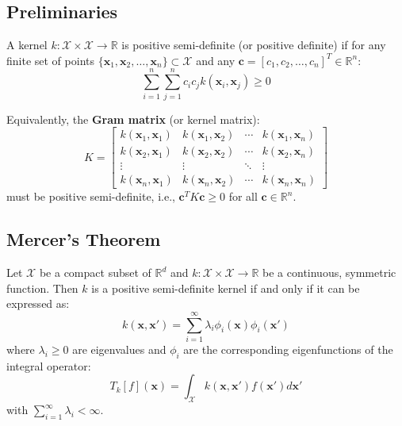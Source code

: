 \documentclass{tufte-handout}
\begin{document}
\subsection{Preliminaries}


A kernel $k: \mathcal{X} \times \mathcal{X} \rightarrow \mathbb{R}$ is positive semi-definite (or positive definite) if for any finite set of points $\{\mathbf{x}_1, \mathbf{x}_2, \ldots, \mathbf{x}_n\} \subset \mathcal{X}$ and any $\mathbf{c} = [c_1, c_2, \ldots, c_n]^T \in \mathbb{R}^n$:
\begin{equation}
\sum_{i=1}^{n}\sum_{j=1}^{n} c_i c_j k(\mathbf{x}_i, \mathbf{x}_j) \geq 0
\end{equation}


Equivalently, the \textbf{Gram matrix} (or kernel matrix):
\begin{equation}
K = \begin{bmatrix}
k(\mathbf{x}_1, \mathbf{x}_1) & k(\mathbf{x}_1, \mathbf{x}_2) & \cdots & k(\mathbf{x}_1, \mathbf{x}_n) \\
k(\mathbf{x}_2, \mathbf{x}_1) & k(\mathbf{x}_2, \mathbf{x}_2) & \cdots & k(\mathbf{x}_2, \mathbf{x}_n) \\
\vdots & \vdots & \ddots & \vdots \\
k(\mathbf{x}_n, \mathbf{x}_1) & k(\mathbf{x}_n, \mathbf{x}_2) & \cdots & k(\mathbf{x}_n, \mathbf{x}_n)
\end{bmatrix}
\end{equation}
must be positive semi-definite, i.e., $\mathbf{c}^TK\mathbf{c} \geq 0$ for all $\mathbf{c} \in \mathbb{R}^n$.

\subsection{Mercer's Theorem}


Let $\mathcal{X}$ be a compact subset of $\mathbb{R}^d$ and $k: \mathcal{X} \times \mathcal{X} \rightarrow \mathbb{R}$ be a continuous, symmetric function. Then $k$ is a positive semi-definite kernel if and only if it can be expressed as:
\begin{equation}
k(\mathbf{x}, \mathbf{x}') = \sum_{i=1}^{\infty} \lambda_i \phi_i(\mathbf{x})\phi_i(\mathbf{x}')
\end{equation}
where $\lambda_i \geq 0$ are eigenvalues and $\phi_i$ are the corresponding eigenfunctions of the integral operator:
\begin{equation}
T_k[f](\mathbf{x}) = \int_{\mathcal{X}} k(\mathbf{x}, \mathbf{x}')f(\mathbf{x}')d\mathbf{x}'
\end{equation}
with $\sum_{i=1}^{\infty}\lambda_i < \infty$.
\end{document}
